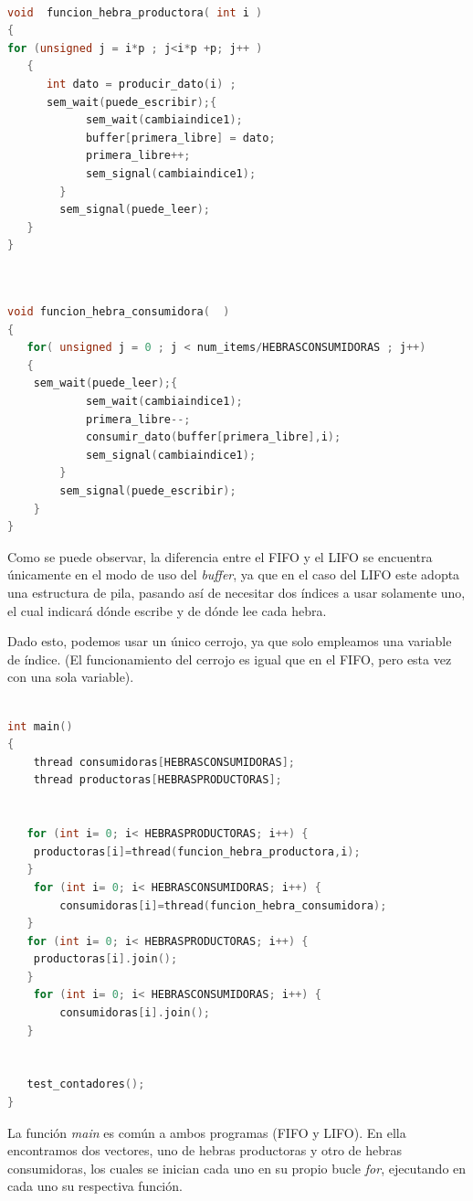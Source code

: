 \documentclass{article}
\begin{document}
\begin{lstlisting}[language=C++,caption=función hebra productora multiple (LIFO) ] 

void  funcion_hebra_productora( int i )
{
for (unsigned j = i*p ; j<i*p +p; j++ )
   {
      int dato = producir_dato(i) ;
	  sem_wait(puede_escribir);{
			sem_wait(cambiaindice1);
			buffer[primera_libre] = dato;
			primera_libre++;
			sem_signal(cambiaindice1);
		}
		sem_signal(puede_leer);
   }
}
\end{lstlisting}
\newpage
\begin{lstlisting}[language=C++,caption=función hebra consumidora multiple (LIFO) ] 


void funcion_hebra_consumidora(  )
{
   for( unsigned j = 0 ; j < num_items/HEBRASCONSUMIDORAS ; j++)
   {
	sem_wait(puede_leer);{
			sem_wait(cambiaindice1);
			primera_libre--;
	        consumir_dato(buffer[primera_libre],i);
			sem_signal(cambiaindice1);
		}
		sem_signal(puede_escribir);
    }
}
\end{lstlisting}

Como se puede observar, la diferencia entre el FIFO y el LIFO se encuentra únicamente en el modo de uso del \textit{buffer}, ya que en el caso del LIFO este adopta una estructura de pila, pasando así de necesitar dos índices a usar solamente uno, el cual indicará dónde escribe y de dónde lee cada hebra. 

Dado esto, podemos usar un único cerrojo, ya que solo empleamos una variable de índice. (El funcionamiento del cerrojo es igual que en el FIFO, pero esta vez con una sola variable).


\begin{lstlisting}[language=C++,caption=función main multiproductor consumidor  (FIFO y LIFO) ] 

int main()
{
	thread consumidoras[HEBRASCONSUMIDORAS];
	thread productoras[HEBRASPRODUCTORAS];


   for (int i= 0; i< HEBRASPRODUCTORAS; i++) {
	productoras[i]=thread(funcion_hebra_productora,i);
   } 
	for (int i= 0; i< HEBRASCONSUMIDORAS; i++) {
		consumidoras[i]=thread(funcion_hebra_consumidora);
   }
   for (int i= 0; i< HEBRASPRODUCTORAS; i++) {
	productoras[i].join();
   } 
	for (int i= 0; i< HEBRASCONSUMIDORAS; i++) {
		consumidoras[i].join();
   }


   test_contadores();
}
\end{lstlisting}

La función \textit{main} es común a ambos programas (FIFO y LIFO). En ella encontramos dos vectores, uno de hebras productoras y otro de hebras consumidoras, los cuales se inician cada uno en su propio bucle \textit{for}, ejecutando en cada uno su respectiva función. 
\end{document}
